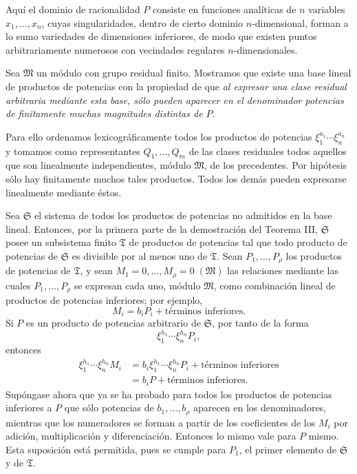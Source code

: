 Aquí el dominio de racionalidad $P$ consiste en funciones analíticas de $n$ variables $x_1,\ldots,x_n$, cuyas singularidades, dentro de cierto dominio $n$-dimensional, forman a lo sumo variedades de dimensiones inferiores, de modo que existen puntos arbitrariamente numerosos con vecindades regulares $n$-dimensionales.

Sea $\mathfrak M$ un módulo con grupo residual finito. Mostramos que existe una base lineal de productos de potencias con la propiedad de que \emph{al expresar una clase residual arbitraria mediante esta base, sólo pueden aparecer en el denominador potencias de finitamente muchas magnitudes distintas de $P$}.

Para ello ordenamos lexicográficamente todos los productos de potencias $\xi_1^{a_1}\cdots\xi_n^{a_n}$ y tomamos como representantes $Q_1,\ldots,Q_m$ de las clases residuales todos aquellos que son linealmente independientes, módulo $\mathfrak M$, de los precedentes. Por hipótesis sólo hay finitamente muchos tales productos. Todos los demás pueden expresarse linealmente mediante éstos.

Sea $\mathfrak S$ el sistema de todos los productos de potencias no admitidos en la base lineal. Entonces, por la primera parte de la demostración del Teorema III, $\mathfrak S$ posee un subsistema finito $\mathfrak T$ de productos de potencias tal que todo producto de potencias de $\mathfrak S$ es divisible por al menos uno de $\mathfrak T$. Sean $P_1,\ldots,P_\rho$ los productos de potencias de $\mathfrak T$, y sean $M_1=0,\ldots,M_\rho=0\;(\mathfrak M)$ las relaciones mediante las cuales $P_1,\ldots,P_\rho$ se expresan cada uno, módulo $\mathfrak M$, como combinación lineal de productos de potencias inferiores; por ejemplo,
\[
 M_i=b_iP_i+\text{términos inferiores}.
\]
Si $P$ es un producto de potencias arbitrario de $\mathfrak S$, por tanto de la forma
\[
 \xi_1^{h_1}\cdots\xi_n^{h_n}P_i,
\]
entonces
\[
\begin{aligned}
 \xi_1^{h_1}\cdots\xi_n^{h_n}M_i
 &=b_i\xi_1^{h_1}\cdots\xi_n^{h_n}P_i+\text{términos inferiores}\\
 &=b_iP+\text{términos inferiores}.
\end{aligned}
\]
Supóngase ahora que ya se ha probado para todos los productos de potencias inferiores a $P$ que sólo potencias de $b_1,\ldots,b_\rho$ aparecen en los denominadores, mientras que los numeradores se forman a partir de los coeficientes de los $M_i$ por adición, multiplicación y diferenciación. Entonces lo mismo vale para $P$ mismo. Esta suposición está permitida, pues se cumple para $P_1$, el primer elemento de $\mathfrak S$ y de $\mathfrak T$.

